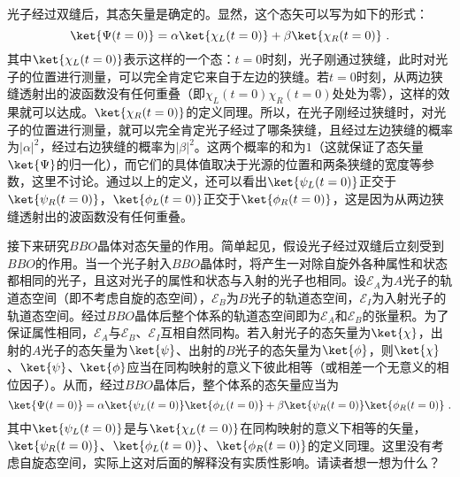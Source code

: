 光子经过双缝后，其态矢量是确定的。显然，这个态矢可以写为如下的形式：
\begin{equation}
\ket{\Psi(t=0)} =\alpha\ket{\chi_L(t=0)}+\beta\ket{\chi_R(t=0)}~.
\end{equation}
其中$\ket{\chi_L(t=0)}$表示这样的一个态：$t=0$时刻，光子刚通过狭缝，此时对光子的位置进行测量，可以完全肯定它来自于左边的狭缝。若$t=0$时刻，从两边狭缝透射出的波函数没有任何重叠（即$\chi_L(t=0)\chi_R(t=0)$处处为零），这样的效果就可以达成。$\ket{\chi_R(t=0)}$的定义同理。所以，在光子刚经过狭缝时，对光子的位置进行测量，就可以完全肯定光子经过了哪条狭缝，且经过左边狭缝的概率为$|\alpha|^2$，经过右边狭缝的概率为$|\beta|^2$。这两个概率的和为$1$（这就保证了态矢量$\ket{\Psi}$的归一化），而它们的具体值取决于光源的位置和两条狭缝的宽度等参数，这里不讨论。通过以上的定义，还可以看出$\ket{\psi_L(t=0)}$正交于$\ket{\psi_R(t=0)}$，$\ket{\phi_L(t=0)}$正交于$\ket{\phi_R(t=0)}$，这是因为从两边狭缝透射出的波函数没有任何重叠。

接下来研究$BBO$晶体对态矢量的作用。简单起见，假设光子经过双缝后立刻受到$BBO$的作用。当一个光子射入$BBO$晶体时，将产生一对除自旋外各种属性和状态都相同的光子，且这对光子的属性和状态与入射的光子也相同。设$\mathscr{E}_A$为$A$光子的轨道态空间（即不考虑自旋的态空间），$\mathscr{E}_B$为$B$光子的轨道态空间，$\mathscr{E}_I$为入射光子的轨道态空间。经过$BBO$晶体后整个体系的轨道态空间即为$\mathscr{E}_A$和$\mathscr{E}_B$的张量积。为了保证属性相同，$\mathscr{E}_A$与$\mathscr{E}_B$、$\mathscr{E}_I$互相自然同构。若入射光子的态矢量为$\ket{\chi}$，出射的$A$光子的态矢量为$\ket{\psi}$、出射的$B$光子的态矢量为$\ket{\phi}$，则$\ket{\chi}$、$\ket{\psi}$、$\ket{\phi}$应当在同构映射的意义下彼此相等（或相差一个无意义的相位因子）。从而，经过$BBO$晶体后，整个体系的态矢量应当为
\begin{equation}
\ket{\Psi(t=0)} =\alpha\ket{\psi_L(t=0)}\ket{\phi_L(t=0)}+\beta\ket{\psi_R(t=0)}\ket{\phi_R(t=0)}~.
\end{equation}
其中$\ket{\psi_L(t=0)}$是与$\ket{\chi_L(t=0)}$在同构映射的意义下相等的矢量，$\ket{\psi_R(t=0)}$、$\ket{\phi_L(t=0)}$、$\ket{\phi_R(t=0)}$的定义同理。这里没有考虑自旋态空间，实际上这对后面的解释没有实质性影响。请读者想一想为什么？

